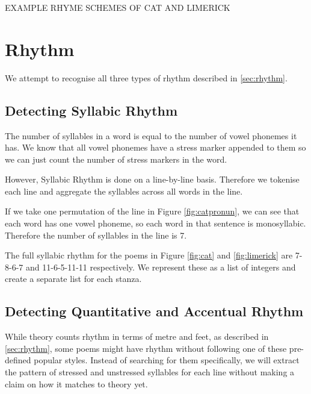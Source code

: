 EXAMPLE RHYME SCHEMES OF CAT AND LIMERICK

\section{Rhythm}

We attempt to recognise all three types of rhythm described in \ref{sec:rhythm}. 

\subsection{Detecting Syllabic Rhythm}

The number of syllables in a word is equal to the number of vowel phonemes it has. We know that all vowel phonemes have a stress marker appended to them so we can just count the number of stress markers in the word.

However, Syllabic Rhythm is done on a line-by-line basis. Therefore we tokenise each line and aggregate the syllables across all words in the line.

If we take one permutation of the line in Figure \ref{fig:catpronun}, we can see that each word has one vowel phoneme, so each word in that sentence is monosyllabic. Therefore the number of syllables in the line is 7.

The full syllabic rhythm for the poems in Figure \ref{fig:cat} and \ref{fig:limerick} are 7-8-6-7 and 11-6-5-11-11 respectively. We represent these as a list of integers and create a separate list for each stanza.

\subsection{Detecting Quantitative and Accentual Rhythm}

While theory counts rhythm in terms of metre and feet, as described in \ref{sec:rhythm}, some poems might have rhythm without following one of these pre-defined popular styles. Instead of searching for them specifically, we will extract the pattern of stressed and unstressed syllables for each line without making a claim on how it matches to theory yet.

